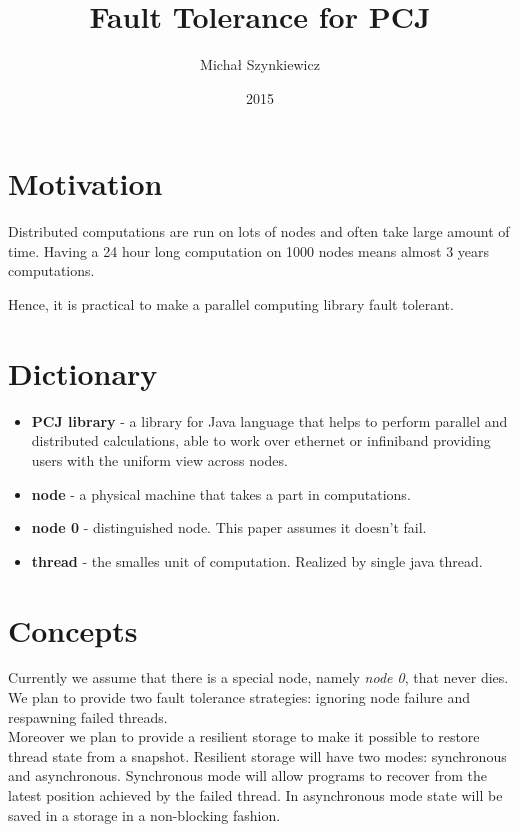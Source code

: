 \documentclass[12pt]{article}
\begin{document}
\title{Fault Tolerance for PCJ}

\author{Michał Szynkiewicz}
\date{2015}
\maketitle

\section{Motivation}

Distributed computations are run on lots of nodes and often take large amount of time.
Having a 24 hour long computation on 1000 nodes means almost 3 years computations.

Hence, it is practical to make a parallel computing library fault tolerant.

\section{Dictionary}
\begin{itemize}
\item \textbf{PCJ library} - a library for Java language that helps to perform parallel and distributed calculations, able to work over ethernet or infiniband providing users with the uniform view across nodes.

\item \textbf{node} - a physical machine that takes a part in computations.

\item \textbf{node 0} - distinguished node. This paper assumes it doesn't fail.

\item \textbf{thread} - the smalles unit of computation. Realized by single java thread.
\end{itemize}

\section{Concepts}
Currently we assume that there is a special node, namely \textit{node 0}, that never dies.
We plan to provide two fault tolerance strategies: ignoring node failure and respawning failed threads.
  \\
Moreover we plan to provide a resilient storage to make it possible to restore thread state from a snapshot.
Resilient storage will have two modes: synchronous and asynchronous.
Synchronous mode will allow programs to recover from the latest position achieved by the failed thread.
In asynchronous mode state will be saved in a storage in a non-blocking fashion.
\\
                \\
\end{document}
